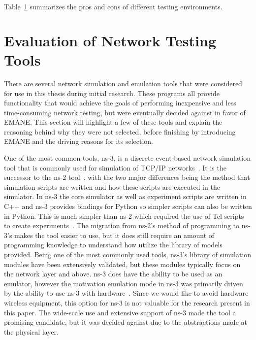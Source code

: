 \begin{table}[!ht]
\begin{adjustbox}{width=\textwidth, center=\textwidth}
\begin{tabular}{|l|l|l|}
			\hline
		\end{tabular}
	\end{adjustbox}
	\label{simtable}
\end{table}

Table~\ref{simtable} summarizes the pros and cons of different testing environments.

\section{Evaluation of Network Testing Tools} %
There are several network simulation and emulation tools that were considered for use in this thesis during initial research.
These programs all provide functionality that would achieve the goals of performing inexpensive and less time-consuming network testing, but were eventually decided against in favor of EMANE.
This section will highlight a few of these tools and explain the reasoning behind why they were not selected, before finishing by introducing EMANE and the driving reasons for its selection. \par

One of the most common tools, ns-3, is a discrete event-based network simulation tool that is commonly used for simulation of TCP/IP networks~\cite{ns3}.
It is the successor to the ns-2 tool~\cite{ns2}, with the two major differences being the method that simulation scripts are written and how these scripts are executed in the simulator.
In ns-3 the core simulator as well as experiment scripts are written in C++ and ns-3 provides bindings for Python so simpler scripts can also be written in Python.
This is much simpler than ns-2 which required the use of Tcl scripts to create experiments~\cite{ns2_ns3}.
The migration from ns-2's method of programming to ns-3's makes the tool easier to use, but it does still require an amount of programming knowledge to understand how utilize the library of models provided.
Being one of the most commonly used tools, ns-3's library of simulation modules have been extensively validated, but these modules typically focus on the network layer and above.
ns-3 does have the ability to be used as an emulator, however the motivation emulation mode in ns-3 was primarily driven by the ability to use ns-3 with hardware~\cite{ns3_orbit}.
Since we would like to avoid hardware wireless equipment, this option for ns-3 is not valuable for the research present in this paper.
The wide-scale use and extensive support of ns-3 made the tool a promising candidate, but it was decided against due to the abstractions made at the physical layer. \par

